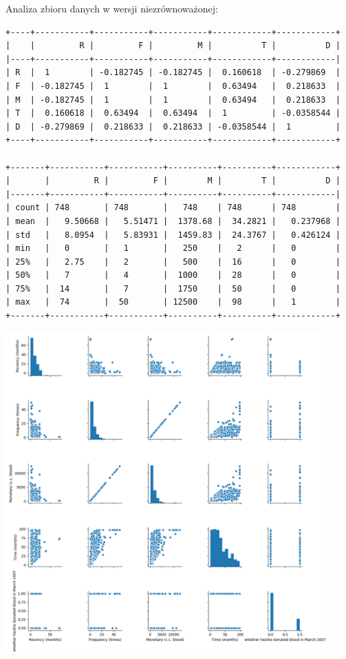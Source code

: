 \documentclass[11pt, a4paper, notitlepage]{report}
\begin{document}
Analiza zbioru danych w wersji niezrównoważonej:
\begin{verbatim}
+----+-----------+-----------+-----------+------------+------------+
|    |         R |         F |         M |          T |          D |
|----+-----------+-----------+-----------+------------+------------|
| R  |  1        | -0.182745 | -0.182745 |  0.160618  | -0.279869  |
| F  | -0.182745 |  1        |  1        |  0.63494   |  0.218633  |
| M  | -0.182745 |  1        |  1        |  0.63494   |  0.218633  |
| T  |  0.160618 |  0.63494  |  0.63494  |  1         | -0.0358544 |
| D  | -0.279869 |  0.218633 |  0.218633 | -0.0358544 |  1         |
+----+-----------+-----------+-----------+------------+------------+

+-------+-----------+-----------+----------+----------+------------+
|       |         R |         F |        M |        T |          D |
|-------+-----------+-----------+----------+----------+------------|
| count | 748       | 748       |   748    | 748      | 748        |
| mean  |   9.50668 |   5.51471 |  1378.68 |  34.2821 |   0.237968 |
| std   |   8.0954  |   5.83931 |  1459.83 |  24.3767 |   0.426124 |
| min   |   0       |   1       |   250    |   2      |   0        |
| 25%   |   2.75    |   2       |   500    |  16      |   0        |
| 50%   |   7       |   4       |  1000    |  28      |   0        |
| 75%   |  14       |   7       |  1750    |  50      |   0        |
| max   |  74       |  50       | 12500    |  98      |   1        |
+-------+-----------+-----------+----------+----------+------------+
\end{verbatim}

\includegraphics[width=350pt]{graphics/correlation_1} \\
\end{document}
